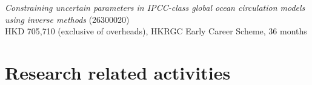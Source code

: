 \documentclass[letterpaper]{article}
\renewenvironment{itemize}{
  \begin{list}{}{
    \setlength{\leftmargin}{1.5em}
  }
}{
  \end{list}
}
\begin{document}
\begin{itemize}



\item[--] \textit{Constraining uncertain parameters in IPCC-class global ocean
circulation models using inverse methods} (26300020)\\
HKD 705,710 (exclusive of overheads), HKRGC Early Career Scheme, 36 months

\end{itemize}

\section*{Research related activities}

\end{document}
